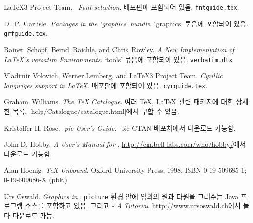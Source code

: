 \begin{thebibliography}{99}
 \LaTeX3 Project Team.  \newblock \emph{\LaTeXe~Font
    selection}. 
  \newblock \LaTeXe{} 배포판에 포함되어 있음. \texttt{fntguide.tex}.

 D.~P.~Carlisle.  \newblock \emph{Packages in the
    `graphics' bundle}. 
  \newblock `graphics' 묶음에 포함되어 있음. \texttt{grfguide.tex}.

 Rainer~Sch\"opf, Bernd~Raichle, and Chris~Rowley.
\newblock \emph{A New Implementation of \LaTeX's verbatim
  Environments}.
  \newblock `tools' 묶음에 포함되어 있음. \texttt{verbatim.dtx}.

 Vladimir Volovich, Werner Lemberg, and \LaTeX3 Project Team.
    \newblock \emph{Cyrillic languages support in \LaTeX}.
  \newblock \LaTeXe{} 배포판에  포함되어 있음. \texttt{cyrguide.tex}.

 Graham~Williams.  \newblock \emph{The TeX
    Catalogue}. 여러 \TeX{}, \LaTeX{} 관련 패키지에 대한 상세한 목록.
  \newblock \CTAN|help/Catalogue/catalogue.html|에서 구할 수 있음.

 Kristoffer H. Rose.
  \newblock \emph{\Xy-pic User's Guide}.  
    \Xy-pic CTAN 배포처에서 다운로드 가능함.

 John D. Hobby.
  \newblock \emph{A User's Manual for \MP}.
  \newblock \url{http://cm.bell-labs.com/who/hobby/}에서 다운로드 가능함.

 Alan Hoenig.
  \newblock \emph{\TeX{} Unbound}. \newblock Oxford University Press, 1998,
    ISBN 0-19-509685-1; 0-19-509686-X (pbk.)

 Urs Oswald.
    \newblock \emph{Graphics in \LaTeXe{}}, 
	\texttt{picture} 환경 안에 임의의 원과 타원을 그려주는 Java 프로그램 소스를 포함하고 있음.
	그리고 
    \emph{\MP{} - A Tutorial}.
  \newblock \url{http://www.ursoswald.ch}에서 둘 다 다운로드 가능.


\end{thebibliography}
